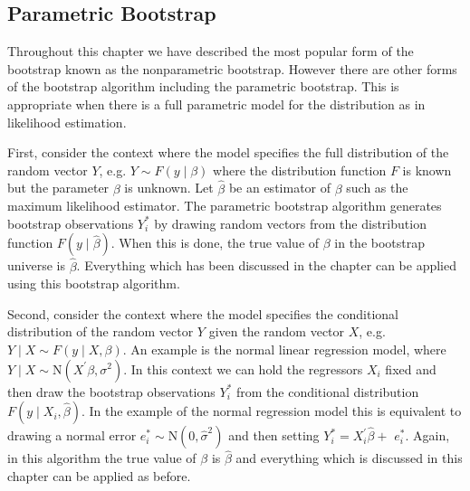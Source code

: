 \documentclass[10pt]{article}
\begin{document}
\subsection{Parametric Bootstrap}
Throughout this chapter we have described the most popular form of the bootstrap known as the nonparametric bootstrap. However there are other forms of the bootstrap algorithm including the parametric bootstrap. This is appropriate when there is a full parametric model for the distribution as in likelihood estimation.

First, consider the context where the model specifies the full distribution of the random vector $Y$, e.g. $Y \sim F(y \mid \beta)$ where the distribution function $F$ is known but the parameter $\beta$ is unknown. Let $\widehat{\beta}$ be an estimator of $\beta$ such as the maximum likelihood estimator. The parametric bootstrap algorithm generates bootstrap observations $Y_{i}^{*}$ by drawing random vectors from the distribution function $F(y \mid \widehat{\beta})$. When this is done, the true value of $\beta$ in the bootstrap universe is $\widehat{\beta}$. Everything which has been discussed in the chapter can be applied using this bootstrap algorithm.

Second, consider the context where the model specifies the conditional distribution of the random vector $Y$ given the random vector $X$, e.g. $Y \mid X \sim F(y \mid X, \beta)$. An example is the normal linear regression model, where $Y \mid X \sim \mathrm{N}\left(X^{\prime} \beta, \sigma^{2}\right)$. In this context we can hold the regressors $X_{i}$ fixed and then draw the bootstrap observations $Y_{i}^{*}$ from the conditional distribution $F\left(y \mid X_{i}, \widehat{\beta}\right)$. In the example of the normal regression model this is equivalent to drawing a normal error $e_{i}^{*} \sim \mathrm{N}\left(0, \widehat{\sigma}^{2}\right)$ and then setting $Y_{i}^{*}=X_{i}^{\prime} \widehat{\beta}+$ $e_{i}^{*}$. Again, in this algorithm the true value of $\beta$ is $\widehat{\beta}$ and everything which is discussed in this chapter can be applied as before.
\end{document}
